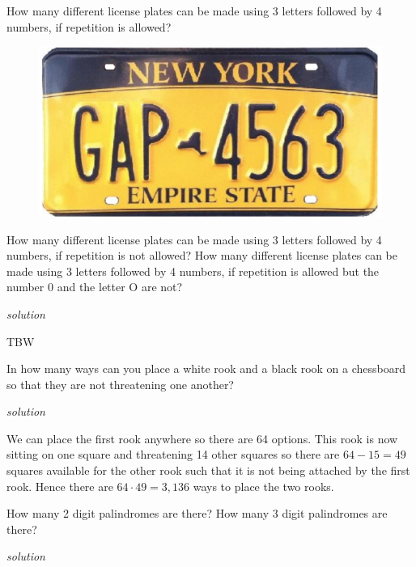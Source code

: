\documentclass{amsbook}
\begin{document}
\begin{Exercise}[title={License Plates}, difficulty =1, label =m5]
   \Question How many different license plates can be made using 3 letters followed by 4 numbers, if repetition is allowed?
    \begin{figure}[H]
        \includegraphics[width=.4\linewidth]{k.png}
    \end{figure}
    \Question How many different license plates can be made using 3 letters followed by 4 numbers, if repetition is not allowed?
    \Question How many different license plates can be made using 3 letters followed by 4 numbers, if repetition is allowed but the number 0 and the letter O are not?
    
    \hfill \emph{solution} 
\end{Exercise}

\begin{Answer}[ref={m5}]
    TBW
\end{Answer}

\begin{Exercise}[title={An Excuse to Play Chess}, difficulty=0, label=m8]
    In how many ways can you place a white rook and a black rook on a chessboard so that they are not threatening one another?

    \hfill \emph{solution} 
\end{Exercise}

\begin{Answer}[ref={m8}]
    We can place the first rook anywhere so there are 64 options. This rook is now sitting on one square and threatening 14 other squares so there are $64-15=49$ squares available for the other rook such that it is not being attached by the first rook. Hence there are $64 \cdot 49=3,136$ ways to place the two rooks.
\end{Answer}

\begin{Exercise}[title={Palindromes}, difficulty=1, label=m6]
    \Question How many 2 digit palindromes are there?
    \Question How many 3 digit palindromes are there?

\hfill \emph{solution} 
\end{Exercise}
\end{document}
